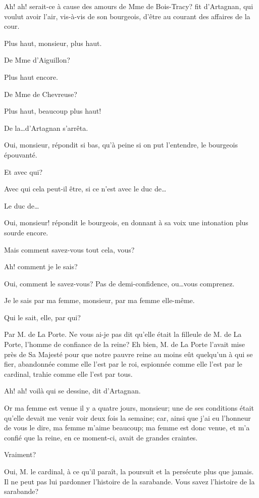 \speak  Ah! ah! serait-ce à cause des amours de Mme de Bois-Tracy? fit d'Artagnan, qui voulut avoir l'air, vis-à-vis de son bourgeois, d'être au courant des affaires de la cour. 

\speak  Plus haut, monsieur, plus haut. 

\speak  De Mme d'Aiguillon? 

\speak  Plus haut encore. 

\speak  De Mme de Chevreuse? 

\speak  Plus haut, beaucoup plus haut! 

\speak  De la\dots d'Artagnan s'arrêta. 

\speak  Oui, monsieur, répondit si bas, qu'à peine si on put l'entendre, le bourgeois épouvanté. 

\speak  Et avec qui? 

\speak  Avec qui cela peut-il être, si ce n'est avec le duc de\dots 

\speak  Le duc de\dots 

\speak  Oui, monsieur! répondit le bourgeois, en donnant à sa voix une intonation plus sourde encore. 

\speak  Mais comment savez-vous tout cela, vous? 

\speak  Ah! comment je le sais? 

\speak  Oui, comment le savez-vous? Pas de demi-confidence, ou\dots vous comprenez. 

\speak  Je le sais par ma femme, monsieur, par ma femme elle-même. 

\speak  Qui le sait, elle, par qui? 

\speak  Par M. de La Porte. Ne vous ai-je pas dit qu'elle était la filleule de M. de La Porte, l'homme de confiance de la reine? Eh bien, M. de La Porte l'avait mise près de Sa Majesté pour que notre pauvre reine au moins eût quelqu'un à qui se fier, abandonnée comme elle l'est par le roi, espionnée comme elle l'est par le cardinal, trahie comme elle l'est par tous. 

\speak  Ah! ah! voilà qui se dessine, dit d'Artagnan. 

\speak  Or ma femme est venue il y a quatre jours, monsieur; une de ses conditions était qu'elle devait me venir voir deux fois la semaine; car, ainsi que j'ai eu l'honneur de vous le dire, ma femme m'aime beaucoup; ma femme est donc venue, et m'a confié que la reine, en ce moment-ci, avait de grandes craintes. 

\speak  Vraiment? 

\speak  Oui, M. le cardinal, à ce qu'il paraît, la poursuit et la persécute plus que jamais. Il ne peut pas lui pardonner l'histoire de la sarabande. Vous savez l'histoire de la sarabande? 


